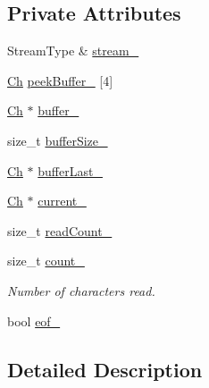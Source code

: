 \subsection*{Private Attributes}
\begin{DoxyCompactItemize}
\item 
Stream\+Type \& \mbox{\hyperlink{classrapidjson_1_1_basic_i_stream_wrapper_aa2da48b0eedc0c1e4352e6130a7d57e0}{stream\+\_\+}}
\item 
\mbox{\hyperlink{classrapidjson_1_1_basic_i_stream_wrapper_a5fd972d8cd20b90ba0772aeebf122597}{Ch}} \mbox{\hyperlink{classrapidjson_1_1_basic_i_stream_wrapper_a43ca5844d6d394f13b176880f094adca}{peek\+Buffer\+\_\+}} \mbox{[}4\mbox{]}
\item 
\mbox{\hyperlink{classrapidjson_1_1_basic_i_stream_wrapper_a5fd972d8cd20b90ba0772aeebf122597}{Ch}} $\ast$ \mbox{\hyperlink{classrapidjson_1_1_basic_i_stream_wrapper_a475db978c2e0154b96f9c95657d71ed7}{buffer\+\_\+}}
\item 
size\+\_\+t \mbox{\hyperlink{classrapidjson_1_1_basic_i_stream_wrapper_a16cd252a0d7d2f78cba2c75f80667879}{buffer\+Size\+\_\+}}
\item 
\mbox{\hyperlink{classrapidjson_1_1_basic_i_stream_wrapper_a5fd972d8cd20b90ba0772aeebf122597}{Ch}} $\ast$ \mbox{\hyperlink{classrapidjson_1_1_basic_i_stream_wrapper_ac6b35e0c1251a30cc985b39d13b9aa00}{buffer\+Last\+\_\+}}
\item 
\mbox{\hyperlink{classrapidjson_1_1_basic_i_stream_wrapper_a5fd972d8cd20b90ba0772aeebf122597}{Ch}} $\ast$ \mbox{\hyperlink{classrapidjson_1_1_basic_i_stream_wrapper_a45d81a28f9445f497e38b8aab759a0b3}{current\+\_\+}}
\item 
size\+\_\+t \mbox{\hyperlink{classrapidjson_1_1_basic_i_stream_wrapper_aa31e373a95bd662b7fcb3347e83419b9}{read\+Count\+\_\+}}
\item 
size\+\_\+t \mbox{\hyperlink{classrapidjson_1_1_basic_i_stream_wrapper_aac23edc96c35ef363d11d4806109284a}{count\+\_\+}}
\begin{DoxyCompactList}\small\item\em Number of characters read. \end{DoxyCompactList}\item 
bool \mbox{\hyperlink{classrapidjson_1_1_basic_i_stream_wrapper_a444e02a06ab6e7ccedb19a8a28b06bb7}{eof\+\_\+}}
\end{DoxyCompactItemize}


\subsection{Detailed Description}
